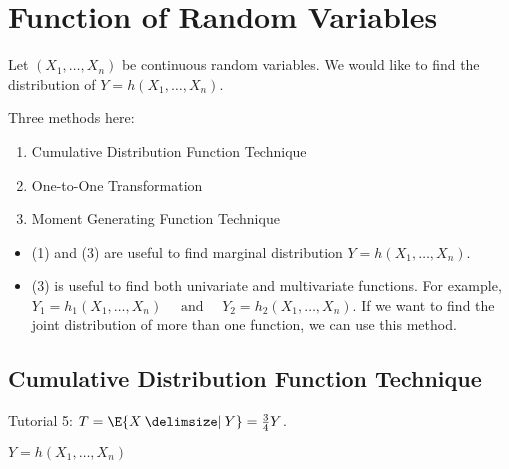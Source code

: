 \chapter{Function of Random Variables}
Let $ (X_1,\ldots,X_n) $ be continuous random
variables. We would like to find the distribution
of $ Y=h(X_1,\ldots,X_n) $.

Three methods here:
\begin{enumerate}[label=(\arabic*)]
    \item Cumulative Distribution Function Technique
    \item One-to-One Transformation
    \item Moment Generating Function Technique
\end{enumerate}
\begin{itemize}
    \item (1) and (3) are useful to find marginal distribution
          $ Y=h(X_1,\ldots,X_n) $.
    \item (3) is useful to find both univariate and multivariate
          functions. For example,
          $ Y_1=h_1(X_1,\ldots,X_n)\quad\text{ and }\quad Y_2=h_2(X_1,\ldots,X_n) $.
          If we want to find the joint distribution of more than one function, we can
          use this method.
\end{itemize}
\section{Cumulative Distribution Function Technique}
Tutorial 5: $ T=\E{X\given Y}=\frac{3}{4} Y $.

$ Y=h(X_1,\ldots,X_n) $

